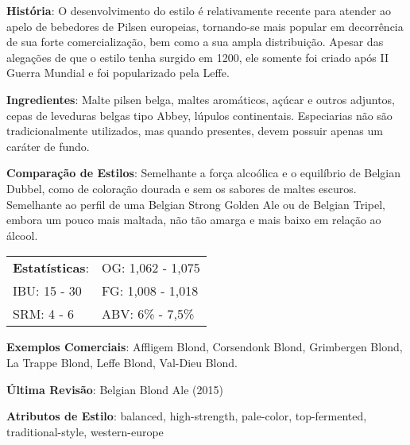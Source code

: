 \textbf{História}: O desenvolvimento do estilo é relativamente recente para atender ao apelo de bebedores de Pilsen europeias, tornando-se mais popular em decorrência de sua forte comercialização, bem como a sua ampla distribuição. Apesar das alegações de que o estilo tenha surgido em 1200, ele somente foi criado após II Guerra Mundial e foi popularizado pela Leffe.

\textbf{Ingredientes}: Malte pilsen belga, maltes aromáticos, açúcar e outros adjuntos, cepas de leveduras belgas tipo Abbey, lúpulos continentais. Especiarias não são tradicionalmente utilizados, mas quando presentes, devem possuir apenas um caráter de fundo.

\textbf{Comparação de Estilos}: Semelhante a força alcoólica e o equilíbrio de Belgian Dubbel, como de coloração dourada e sem os sabores de maltes escuros. Semelhante ao perfil de uma Belgian Strong Golden Ale ou de Belgian Tripel, embora um pouco mais maltada, não tão amarga e mais baixo em relação ao álcool.

\begin{tabular}{@{}p{35mm}p{35mm}@{}}
  \textbf{Estatísticas}: & OG: 1,062 - 1,075 \\
  IBU: 15 - 30  & FG: 1,008 - 1,018  \\
  SRM: 4 - 6  & ABV: 6\% - 7,5\%
\end{tabular}

\textbf{Exemplos Comerciais}: Affligem Blond, Corsendonk Blond, Grimbergen Blond, La Trappe Blond, Leffe Blond, Val-Dieu Blond.

\textbf{Última Revisão}: Belgian Blond Ale (2015)

\textbf{Atributos de Estilo}: balanced, high-strength, pale-color, top-fermented, traditional-style, western-europe
